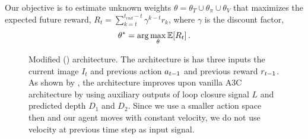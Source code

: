 Our objective is to estimate unknown weights $\theta = \theta_T \cup \theta_\pi \cup \theta_V$ that maximizes the expected future reward, $R_t = \sum_{k=t}^{t_{end} - t} \gamma^{k-t} r_k$, where $\gamma$ is the discount factor,
%
\begin{align}
\theta^* = \arg\max_{\theta} \mathbb{E}[R_t] \,.
\end{align}
%
\begin{figure}%
\begin{center}
\scalebox{1.3}{}%
\end{center}
\caption{Modified \NavAiiiCDiDiiL{} (\cite{MiPaViICLR2017}) architecture.
The architecture is has three inputs the current image $I_t$ and previous action $a_{t-1}$ and previous reward $r_{t-1}$.
As shown by \cite{MiPaViICLR2017}, the architecture improves upon vanilla A3C architecture by using auxiliary outputs of loop closure signal $L$ and predicted depth $D_1$ and $D_2$.
Since we use a smaller action space then \cite{MiPaViICLR2017} and our agent moves with constant velocity, we do not use velocity at previous time step as input signal.}
\label{fig:architectures}
\end{figure}

